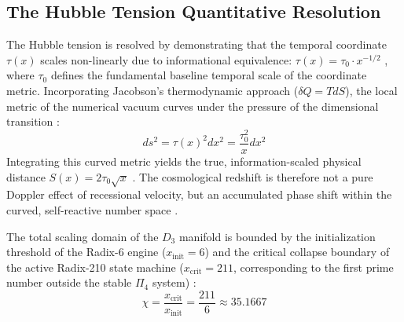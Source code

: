 \documentclass[twocolumn]{aa}
\begin{document}
\subsection{The Hubble Tension Quantitative Resolution}
The Hubble tension is resolved by demonstrating that the temporal coordinate $\tau(x)$ scales non-linearly due to informational equivalence: $\tau(x) = \tau_0 \cdot x^{-1/2}$ \cite{jacobson1995}, where $\tau_0$ defines the fundamental baseline temporal scale of the coordinate metric. Incorporating Jacobson's thermodynamic approach ($\delta Q = T dS$), the local metric of the numerical vacuum curves under the pressure of the dimensional transition \cite{jacobson1995}:
\begin{equation}
ds^2 = \tau(x)^2 dx^2 = \frac{\tau_0^2}{x} dx^2
\end{equation}
Integrating this curved metric yields the true, information-scaled physical distance $S(x) = 2\tau_0\sqrt{x}$ \cite{jacobson1995}. 
The cosmological redshift is therefore not a pure Doppler effect of recessional velocity, but an accumulated phase shift within the curved, self-reactive number space \cite{riemann1857}.

The total scaling domain of the $D_3$ manifold is bounded by the initialization threshold of the Radix-6 engine ($x_{\text{init}} = 6$) and the critical collapse boundary of the active Radix-210 state machine ($x_{\text{crit}} = 211$, corresponding to the first prime number outside the stable $\Pi_4$ system) \cite{riemann1857}:
\begin{equation}
\chi = \frac{x_{\text{crit}}}{x_{\text{init}}} = \frac{211}{6} \approx 35.1667
\end{equation}
\end{document}
